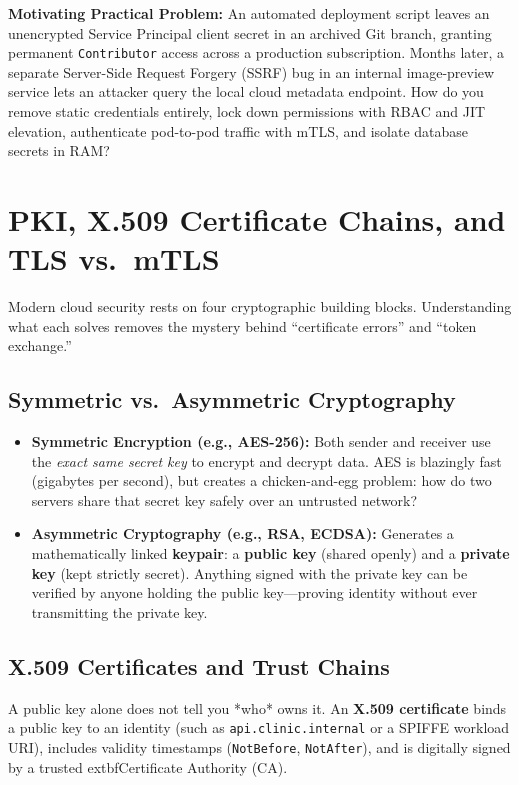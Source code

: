 \begin{chaptergoalsbox}
\textbf{Motivating Practical Problem:}
An automated deployment script leaves an unencrypted Service Principal client secret in an archived Git branch, granting permanent \texttt{Contributor} access across a production subscription. Months later, a separate Server-Side Request Forgery (SSRF) bug in an internal image-preview service lets an attacker query the local cloud metadata endpoint. How do you remove static credentials entirely, lock down permissions with RBAC and JIT elevation, authenticate pod-to-pod traffic with mTLS, and isolate database secrets in RAM?
\end{chaptergoalsbox}

\section{PKI, X.509 Certificate Chains, and TLS vs.\ mTLS}
\label{sec:v3-ch05-pki-primer}

Modern cloud security rests on four cryptographic building blocks. Understanding what each solves removes the mystery behind ``certificate errors'' and ``token exchange.''

\subsection{Symmetric vs.\ Asymmetric Cryptography}
\begin{itemize}[leftmargin=12pt]
  \item \textbf{Symmetric Encryption (e.g., AES-256):} Both sender and receiver use the \emph{exact same secret key} to encrypt and decrypt data. AES is blazingly fast (gigabytes per second), but creates a chicken-and-egg problem: how do two servers share that secret key safely over an untrusted network?
  \item \textbf{Asymmetric Cryptography (e.g., RSA, ECDSA):} Generates a mathematically linked \textbf{keypair}: a \textbf{public key} (shared openly) and a \textbf{private key} (kept strictly secret). Anything signed with the private key can be verified by anyone holding the public key—proving identity without ever transmitting the private key.
\end{itemize}

\subsection{X.509 Certificates and Trust Chains}
A public key alone does not tell you *who* owns it. An \textbf{X.509 certificate} binds a public key to an identity (such as \texttt{api.clinic.internal} or a SPIFFE workload URI), includes validity timestamps (\texttt{NotBefore}, \texttt{NotAfter}), and is digitally signed by a trusted 	extbf{Certificate Authority (CA)}.

